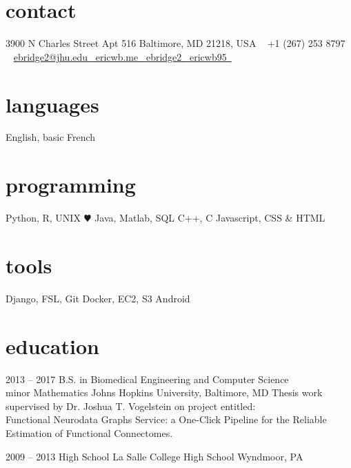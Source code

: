 \documentclass[]{friggeri-cv} %
\begin{document}


\begin{aside} %
\section{contact}
3900 N Charles Street
Apt 516
Baltimore, MD
21218, USA
~
+1 (267) 253 8797~{\color{green} \faMobilePhone}
~
\href{mailto:ebridge2@jhu.edu}{ebridge2@jhu.edu~{\color{red} \faEnvelope}}
\href{http://ericwb.me}{ericwb.me~{\color{brown} \faGlobe}}
\href{http://github.com/ebridge2}{ebridge2~{\color{purple} \faGithub}}
\href{https://www.linkedin.com/in/ericwb95}{ericwb95~{\color{blue} \faLinkedin}}
\section{languages}
English, basic French
\section{programming}
Python, R, UNIX {\color{red} $\varheartsuit$}
Java, Matlab, SQL
C++, C
Javascript, CSS \& HTML
\section{tools}
Django, FSL, Git
Docker, EC2, S3
Android
\end{aside}


\section{education}

\begin{entrylist}


\entry
{2013 -- 2017}
{B.S. {\normalfont in Biomedical Engineering and Computer Science\\ minor Mathematics}}
{Johns Hopkins University, Baltimore, MD}
{Thesis work supervised by Dr. Joshua T. Vogelstein on project entitled: \\Functional Neurodata Graphs Service: a One-Click Pipeline for the Reliable Estimation of Functional Connectomes.}


\entry
{2009 -- 2013}
{High School {\normalfont La Salle College High School}}
{Wyndmoor, PA}

\end{entrylist}
\end{document}
